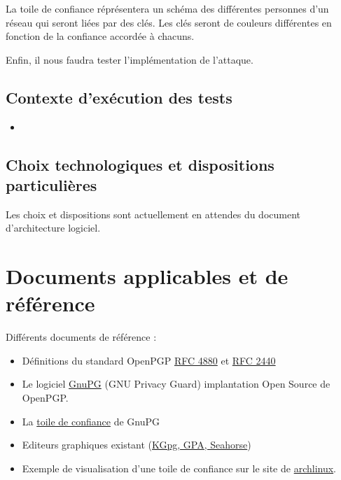 \documentclass{../res/univ-projet}
\begin{document}
La toile de confiance réprésentera un schéma des différentes personnes d'un réseau qui seront liées par des clés.
Les clés seront de couleurs différentes en fonction de la confiance accordée à chacuns.

Enfin, il nous faudra tester l'implémentation de l'attaque. 

\subsection{Contexte d'exécution des tests}
\begin{itemize}
 \item
\end{itemize}

\subsection{Choix technologiques et dispositions particulières}
Les choix et dispositions sont actuellement en attendes du document d'architecture logiciel.



\section{Documents applicables et de référence}
Différents documents de référence :
\begin{itemize}
\item Définitions du standard OpenPGP \href{file:../../ressources/openPGP/rfc4880-en.pdf}{RFC 4880}
  et \href{file:../../ressources/openPGP/rfc2440-fr.pdf}{RFC 2440}
\item Le logiciel \href{https://www.gnupg.org/}{GnuPG} (GNU Privacy Guard) implantation Open Source
  de OpenPGP.
\item La \href{https://www.gnupg.org/gph/fr/manual.html#AEN541}{toile de confiance} de GnuPG
\item Editeurs graphiques existant 
  (\href{http://www.gnupg.org/related_software/frontends.en.html}{KGpg, GPA, Seahorse})
\item Exemple de visualisation d'une toile de confiance sur le site de 
  \href{https://www.archlinux.org/master-keys/#visualization}{archlinux}.
\end{itemize}
\end{document}
